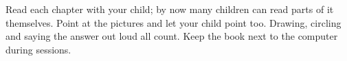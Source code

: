 \documentclass[track=junior,level=2]{kidscode}
\begin{document}

\begin{grownup}
Read each chapter with your child; by now many children can read parts of it themselves. Point at
the pictures and let your child point too. Drawing, circling and saying the answer out loud all
count. Keep the book next to the computer during sessions.
\end{grownup}
\kcweeklytoc
{}
\end{document}
